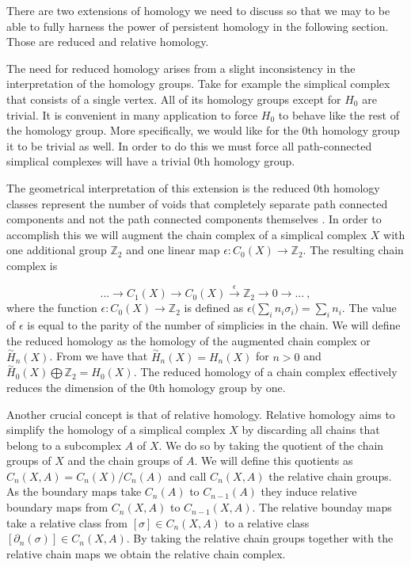 There are two extensions of homology we need to discuss so that we may to be able to fully harness the power of persistent homology in the following section. Those are reduced and relative homology.

The need for reduced homology arises from a slight inconsistency in the interpretation of the homology groups. Take for example the simplical complex that consists of a single vertex. All of its homology groups except for $H_0$ are trivial. It is convenient in many application to force $H_0$ to behave like the rest of the homology group. More specifically, we would like for the 0th homology group it to be trivial as well. In order to do this we must force all path-connected simplical complexes will have a trivial 0th homology group.

The geometrical interpretation of this extension is the reduced 0th homology classes represent the number of voids that completely separate path connected components and not the path connected components themselves \cite{comp-topo}. In order to accomplish this we will augment the chain complex of a simplical complex $X$ with one additional group $\mathbb{Z}_2$ and one linear map $\epsilon : C_0(X) \to \mathbb{Z}_2$. The resulting chain complex is

$$ ... \longrightarrow C_1(X) \longrightarrow C_0(X) \overset{\epsilon}{\longrightarrow} \mathbb{Z}_2 \longrightarrow 0 \longrightarrow ...~, $$
where the function $\epsilon: C_0(X) \to \mathbb{Z}_2$ is defined as $\epsilon\big(\sum_{i}n_i\sigma_i\big) = \sum_{i}n_i$. The value of $\epsilon$ is equal to the parity of the number of simplicies in the chain. We will define the reduced homology as the homology of the augmented chain complex or $\overset{\sim}{H}_n(X)$. From \cite{algebraic-topology} we have that $\overset{\sim}{H}_n(X) = H_n(X)$ for $n > 0$ and $\overset{\sim}{H}_0(X) \bigoplus \mathbb{Z}_2 = H_0(X)$. The reduced homology of a chain complex effectively reduces the dimension of the 0th homology group by one.

Another crucial concept is that of relative homology. Relative homology aims to simplify the homology of a simplical complex $X$ by discarding all chains that belong to a subcomplex $A$ of $X$. We do so by taking the quotient of the chain groups of $X$ and the chain groups of $A$. We will define this quotients as $C_n(X, A) = C_n(X) / C_n(A)$ and call $C_n(X, A)$ the relative chain groups. As the boundary maps take $C_n(A)$ to $C_{n-1}(A)$ they induce relative boundary maps from $C_n(X, A)$ to $C_{n-1}(X, A)$. The relative bounday maps take a relative class from $[\sigma] \in C_n(X, A)$ to a relative class $[\partial_n(\sigma)] \in C_n(X, A)$. By taking the relative chain groups together with the relative chain maps we obtain the relative chain complex.


